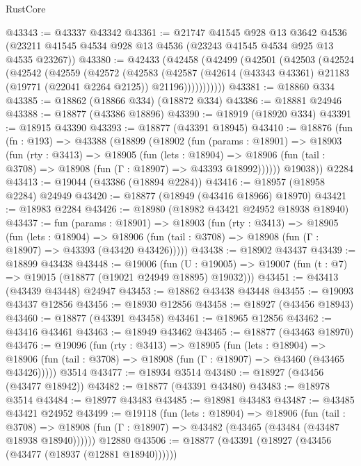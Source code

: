 \begin{lexlean}{RustCore}
\begin{coremodule}
@43343 := @43337 @43342
@43361 := @21747
    @41545
    @928
    @13
    @3642
    @4536
    (@23211 @41545 @4534 @928 @13 @4536 (@23243 @41545 @4534 @925 @13 @4535 @23267))
@43380 := @42433
    (@42458
      (@42499
        (@42501
          (@42503
            (@42524
              (@42542
                (@42559
                  (@42572
                    (@42583
                      (@42587
                        (@42614
                          (@43343 @43361)
                          @21183
                          (@19771 (@22041 @2264 @2125))
                          @21196)))))))))))
@43381 := @18860 @334
@43385 := @18862 (@18866 @334) (@18872 @334)
@43386 := @18881 @24946
@43388 := @18877 (@43386 @18896)
@43390 := @18919 (@18920 @334)
@43391 := @18915 @43390
@43393 := @18877 (@43391 @18945)
@43410 := @18876
    (fun (fn : @193) =>
    @43388
      (@18899
        (@18902
          (fun (params : @18901) =>
          @18903
            (fun (rty : @3413) =>
            @18905
              (fun (lets : @18904) =>
              @18906 (fun (tail : @3708) => @18908 (fun (Γ : @18907) => @43393 @18992))))))
        @19038))
    @2284
@43413 := @19044 (@43386 (@18894 @2284))
@43416 := @18957 (@18958 @2284) @24949
@43420 := @18877 (@18949 (@43416 @18966) @18970)
@43421 := @18983 @2284
@43426 := @18980 (@18982 @43421 @24952 @18938 @18940)
@43437 := fun (params : @18901) =>
  @18903
    (fun (rty : @3413) =>
    @18905
      (fun (lets : @18904) =>
      @18906 (fun (tail : @3708) => @18908 (fun (Γ : @18907) => @43393 (@43420 @43426)))))
@43438 := @18902 @43437
@43439 := @18899 @43438
@43448 := @19006
    (fun (U : @19005) => @19007 (fun (t : @7) => @19015 (@18877 (@19021 @24949 @18895) @19032)))
@43451 := @43413 (@43439 @43448) @24947
@43453 := @18862 @43438 @43448
@43455 := @19093 @43437 @12856
@43456 := @18930 @12856
@43458 := @18927 (@43456 @18943)
@43460 := @18877 (@43391 @43458)
@43461 := @18965 @12856
@43462 := @43416 @43461
@43463 := @18949 @43462
@43465 := @18877 (@43463 @18970)
@43476 := @19096
    (fun (rty : @3413) =>
    @18905
      (fun (lets : @18904) =>
      @18906 (fun (tail : @3708) => @18908 (fun (Γ : @18907) => @43460 (@43465 @43426)))))
    @3514
@43477 := @18934 @3514
@43480 := @18927 (@43456 (@43477 @18942))
@43482 := @18877 (@43391 @43480)
@43483 := @18978 @3514
@43484 := @18977 @43483
@43485 := @18981 @43483
@43487 := @43485 @43421 @24952
@43499 := @19118
    (fun (lets : @18904) =>
    @18906
      (fun (tail : @3708) =>
      @18908 (fun (Γ : @18907) => @43482 (@43465 (@43484 (@43487 @18938 @18940))))))
    @12880
@43506 := @18877 (@43391 (@18927 (@43456 (@43477 (@18937 (@12881 @18940))))))

\end{coremodule}
\end{lexlean}
